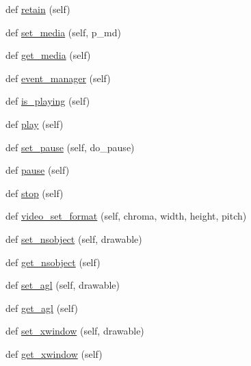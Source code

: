 \begin{DoxyCompactItemize}
\item 
def \hyperlink{classsrc_1_1lib_1_1vlc_1_1MediaPlayer_ac0121fad637351ed9aeab49b88ed88be}{retain} (self)
\item 
def \hyperlink{classsrc_1_1lib_1_1vlc_1_1MediaPlayer_a45a307fa37ff9bbeec84124508726653}{set\+\_\+media} (self, p\+\_\+md)
\item 
def \hyperlink{classsrc_1_1lib_1_1vlc_1_1MediaPlayer_aec7d3bca8d27830f54f114602acae3a9}{get\+\_\+media} (self)
\item 
def \hyperlink{classsrc_1_1lib_1_1vlc_1_1MediaPlayer_a9b5c63ec99ddbbed2dc0a34cbcbc6891}{event\+\_\+manager} (self)
\item 
def \hyperlink{classsrc_1_1lib_1_1vlc_1_1MediaPlayer_a05082c680fd1bcdc16eb37af9e68b035}{is\+\_\+playing} (self)
\item 
def \hyperlink{classsrc_1_1lib_1_1vlc_1_1MediaPlayer_a4ee719f902692b68bb0c2f8e6e6bc40d}{play} (self)
\item 
def \hyperlink{classsrc_1_1lib_1_1vlc_1_1MediaPlayer_a7a22f40a01f996b374fccb68daf17f89}{set\+\_\+pause} (self, do\+\_\+pause)
\item 
def \hyperlink{classsrc_1_1lib_1_1vlc_1_1MediaPlayer_acaf59e59e5945245a78397df9c98b177}{pause} (self)
\item 
def \hyperlink{classsrc_1_1lib_1_1vlc_1_1MediaPlayer_a0843d58c2e37d5d9cb48cc06974a515e}{stop} (self)
\item 
def \hyperlink{classsrc_1_1lib_1_1vlc_1_1MediaPlayer_a313c0554d2c88f2688872a00da329752}{video\+\_\+set\+\_\+format} (self, chroma, width, height, pitch)
\item 
def \hyperlink{classsrc_1_1lib_1_1vlc_1_1MediaPlayer_a687928ea3d9fb590c0d0056887c71556}{set\+\_\+nsobject} (self, drawable)
\item 
def \hyperlink{classsrc_1_1lib_1_1vlc_1_1MediaPlayer_ac2976c87f9e1d84603ddb942ce277c4c}{get\+\_\+nsobject} (self)
\item 
def \hyperlink{classsrc_1_1lib_1_1vlc_1_1MediaPlayer_a07f411e0da32789ae56c94f11128ddac}{set\+\_\+agl} (self, drawable)
\item 
def \hyperlink{classsrc_1_1lib_1_1vlc_1_1MediaPlayer_a7cca20069084bf8450325c0def66e5d4}{get\+\_\+agl} (self)
\item 
def \hyperlink{classsrc_1_1lib_1_1vlc_1_1MediaPlayer_a8f1c62c5fe29fad1369b0d22825aa378}{set\+\_\+xwindow} (self, drawable)
\item 
def \hyperlink{classsrc_1_1lib_1_1vlc_1_1MediaPlayer_af055577c7417fcac511e59df093391bb}{get\+\_\+xwindow} (self)

\end{DoxyCompactItemize}
